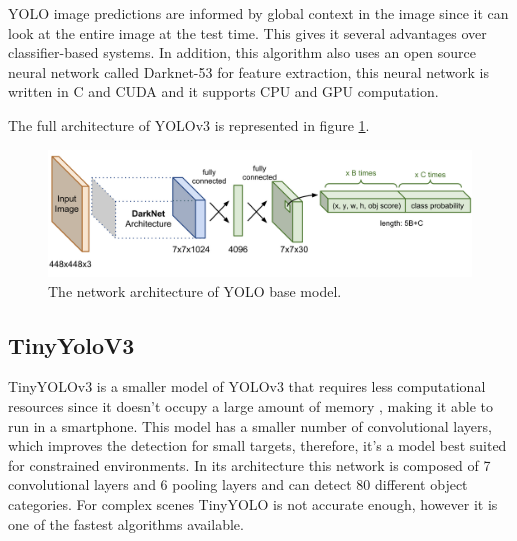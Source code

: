     \newpage
    \par YOLO image predictions are informed by global context in the image since it can look at the entire image at the test time. This gives it several advantages over classifier-based systems. In addition, this algorithm also uses an open source neural network called Darknet-53 for feature extraction, this neural network is written in C and CUDA and it supports CPU and GPU computation. \cite{Redmon2018}\par 
    \par The full architecture of YOLOv3 is represented in figure \ref{fig:yolov3}.

    \begin{figure}[htb]
        \centering
        \includegraphics[scale = 0.26]{Sections/2StateOfTheArt/2_images/yolo-network-architecture.png}
        \caption{The network architecture of YOLO base model.\cite{weng2018detection4} }
        \label{fig:yolov3} 
    \end{figure}

    

   


    \subsection{TinyYoloV3}
    \label{sec:tiny_yolo}

    TinyYOLOv3 is a smaller model of YOLOv3 that requires less computational resources since it doesn’t occupy a large amount of memory , making it able to run in a smartphone. This model has a smaller number of convolutional layers, which improves the detection for small targets, therefore, it’s a model best suited for constrained environments. In its architecture this network is composed of 7 convolutional layers and 6 pooling layers and can detect 80 different object categories.  For complex scenes TinyYOLO is not accurate enough, however it is one of the fastest algorithms available. \cite{Yi2019}



